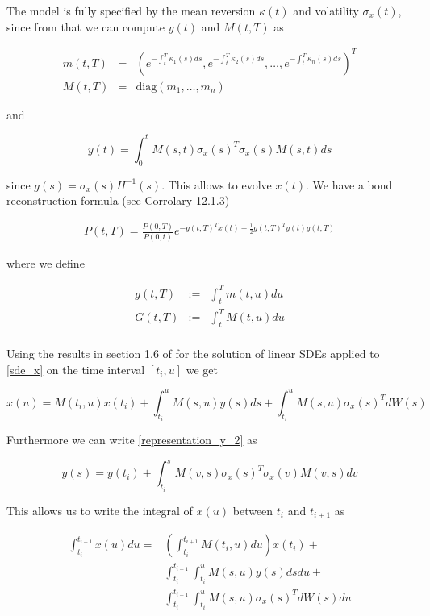 \documentclass{amsart}
\theoremstyle{plain}
\numberwithin{equation}{section}
\begin{document}
The model is fully specified by the mean reversion $\kappa(t)$ and volatility $\sigma_x(t)$, since from that we can
compute $y(t)$ and $M(t,T)$ as

\begin{eqnarray}
  m(t,T) &=& \left( e^{-\int_t^T \kappa_1(s) ds}, e^{-\int_t^T \kappa_2(s) ds}, \ldots, e^{-\int_t^T \kappa_n(s) ds} \right)^T \\
  M(t,T) &=& \text{diag}(m_1, \ldots, m_n)
\end{eqnarray}

and

\begin{equation}\label{representation_y_2}
y(t) = \int_0^t M(s,t) \sigma_x(s)^T \sigma_x(s) M(s,t) ds
\end{equation}

since $g(s) =\sigma_x(s)H^{-1}(s)$. This allows to evolve $x(t)$. We have a bond reconstruction formula (see
\cite{Andersen_Piterbarg_2010} Corrolary 12.1.3)

\begin{eqnarray}
  P(t,T) = \frac{P(0,T)}{P(0,t)}e^{-g(t,T)^T x(t) - \frac{1}{2}g(t,T)^Ty(t)g(t,T)}
\end{eqnarray}

where we define

\begin{eqnarray} 
  g(t,T) &:=& \int_t^T m(t,u) du \\
  G(t,T) &:=& \int_t^T M(t,u) du \\
\end{eqnarray}

Using the results in section 1.6 of \cite{Andersen_Piterbarg_2010} for the solution of linear SDEs applied to \ref{sde_x}
on the time interval $[t_i, u]$ we get

\begin{equation}
x(u) = M(t_i,u) x(t_i) + \int_{t_i}^u M(s,u) y(s) ds + \int_{t_i}^u M(s,u) \sigma_x(s)^T dW(s)
\end{equation}

Furthermore we can write \ref{representation_y_2} as

\begin{equation}
y(s) = y(t_i) + \int_{t_i}^s M(v,s) \sigma_x(s)^T \sigma_x(v) M(v,s) dv
\end{equation}

This allows us to write the integral of $x(u)$ between $t_i$ and $t_{i+1}$ as

\begin{equation}
  \begin{split}
    \int_{t_i}^{t_{i+1}} x(u) du =& \left( \int_{t_i}^{t_{i+1}} M(t_i,u) du \right) x(t_i) + \\
     & \int_{t_i}^{t_{i+1}} \int_{t_i}^u M(s,u) y(s) ds du + \\
     & \int_{t_i}^{t_{i+1}} \int_{t_i}^u M(s,u) \sigma_x(s)^T dW(s) du
  \end{split}
\end{equation}
\end{document}
